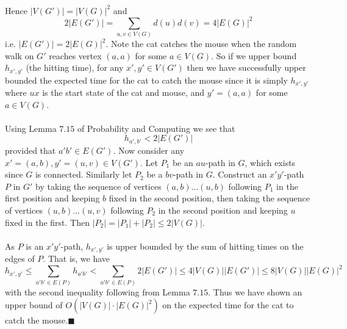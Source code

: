 \documentclass[letterpaper,12pt,oneside,onecolumn]{article}
\begin{document}
\paragraph{}
Hence $|V(G')| = |V(G)|^2$ and 
$$2|E(G')| = \sum_{u,v \in V(G)} d(u)d(v) = 4|E(G)|^2$$
i.e. $|E(G')| = 2|E(G)|^2$. Note the cat catches the mouse when the random walk on $G'$ reaches vertex $(a,a)$ for some $a \in V(G)$. So if we upper bound $h_{x',y'}$ (the hitting time), for any $x', y' \in V(G')$ then we have successfully upper bounded the expected time for the cat to catch the mouse since it is simply $h_{x',y'}$ where $ux$ is the start state of the cat and mouse, and $y' = (a,a)$ for some $a \in V(G)$.
\paragraph{}
Using Lemma $7.15$ of Probability and Computing we see that 
$$h_{a',b'} < 2|E(G')|$$
provided that $a'b' \in E(G')$. Now consider any $x'=(a,b), y'=(u,v) \in V(G')$. Let $P_1$ be an $au$-path in $G$, which exists since $G$ is connected. Similarly let $P_2$ be a $bv$-path in $G$. Construct an $x'y'$-path $P$ in $G'$ by taking the sequence of vertices $(a,b) \dots (u,b)$ following $P_1$ in the first position and keeping $b$ fixed in the second position, then taking the sequence of vertices $(u,b) \dots (u,v)$ following $P_2$ in the second position and keeping $u$ fixed in the first. Then $|P_2|  = |P_1| + |P_2| \leq 2|V(G)|$.
\paragraph{}
As $P$ is an $x'y'$-path, $h_{x',y'}$ is upper bounded by the sum of hitting times on the edges of $P$. That is, we have
$$h_{x',y'} \leq \sum_{a'b' \in E(P)} h_{a'b'} <  \sum_{a'b' \in E(P)} 2|E(G')| \leq 4|V(G)||E(G')| \leq 8|V(G)||E(G)|^2$$
with the second inequality following from Lemma $7.15$. Thus we have shown an upper bound of $O(|V(G)|\cdot|E(G)|^2)$ on the expected time for the cat to catch the mouse.$\blacksquare$
\end{document}
